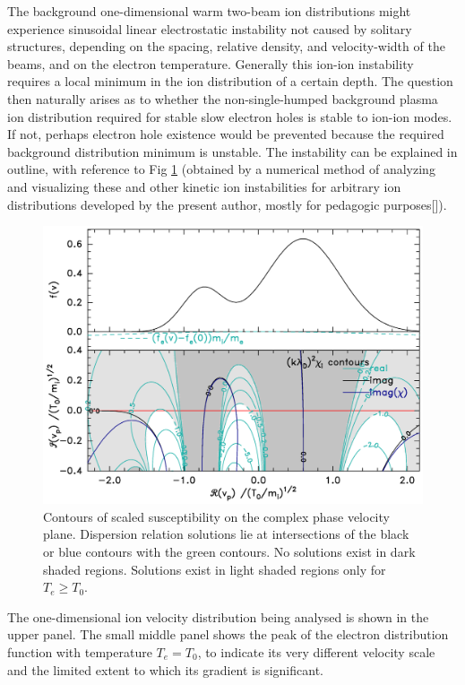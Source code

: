 \documentclass[12pt]{article}
\begin{document}
The background one-dimensional warm two-beam ion distributions might
experience sinusoidal linear electrostatic instability not caused by
solitary structures, depending on the spacing, relative density, and
velocity-width of the beams, and on the electron
temperature\cite{Stringer1964,Fried1966}. Generally this ion-ion
instability requires a local minimum in the ion distribution of a
certain depth. The question then naturally arises as to whether the
non-single-humped background plasma ion distribution required for
stable slow electron holes is stable to ion-ion modes. If not, perhaps
electron hole existence would be prevented because the required
background distribution minimum is unstable.  The instability can
be explained in outline, with reference to Fig \ref{fig:ionstability}
(obtained by a numerical method of analyzing and visualizing these and
other kinetic ion instabilities for arbitrary ion distributions
developed by the present author, mostly for pedagogic purposes[]).
\begin{figure}[htp]
  \centering
  \includegraphics[width=.7\hsize]{ionstabplot}
  \caption{Contours of scaled susceptibility on the complex phase
    velocity plane. Dispersion relation solutions lie at
    intersections of the black or blue contours with the green
    contours. No solutions exist in dark shaded regions. Solutions
    exist in light shaded regions only for $T_e\ge T_0$.}
  \label{fig:ionstability}
\end{figure}
The one-dimensional ion velocity distribution being analysed is shown
in the upper panel. The small middle panel shows the peak of the
electron distribution function with temperature $T_e=T_0$, to indicate
its very different velocity scale and the limited extent to which its gradient
is significant. 
\end{document}
